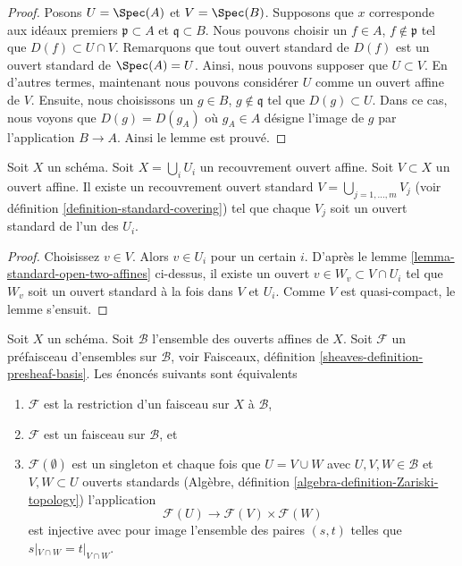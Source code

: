 \begin{proof}
Posons $U = \Spec(A)$ et $V = \Spec(B)$. Supposons
que $x$ corresponde aux idéaux premiers $\mathfrak p \subset
A$ et $\mathfrak q \subset B$. Nous pouvons
choisir un $f \in A$, $f \not \in \mathfrak p$ tel que $D(f) \subset
U \cap V$. Remarquons que tout ouvert standard de $D(f)$ est un ouvert
standard de $\Spec(A) = U$. Ainsi, nous pouvons supposer que $U
\subset V$. En d'autres termes, maintenant nous pouvons considérer
$U$ comme un ouvert affine de $V$. Ensuite, nous
choisissons un $g \in B$, $g \not \in \mathfrak
q$ tel que $D(g) \subset U$. Dans ce cas, nous voyons que $D(g) =
D(g_A)$ où $g_A \in A$ désigne l'image de $g$ par l'application $B \to A$.
Ainsi le lemme est prouvé.
\end{proof}

\begin{lemma}
\label{lemma-good-subcover}
Soit $X$ un schéma.
Soit $X = \bigcup_i U_i$ un recouvrement ouvert affine.
Soit $V \subset X$ un ouvert affine.
Il existe un recouvrement ouvert standard
$V = \bigcup_{j = 1, \ldots, m} V_j$ (voir
définition \ref{definition-standard-covering})
tel que chaque $V_j$ soit un ouvert standard de l'un des $U_i$.
\end{lemma}

\begin{proof}
Choisissez $v \in V$. Alors $v \in U_i$ pour un certain
$i$. D'après le lemme \ref{lemma-standard-open-two-affines} ci-dessus, il existe un
ouvert $v \in W_v \subset V \cap U_i$ tel que
$W_v$ soit un ouvert standard à la fois dans $V$ et
$U_i$. Comme $V$ est quasi-compact, le lemme s'ensuit.
\end{proof}

\begin{lemma}
\label{lemma-sheaf-on-affines}
Soit $X$ un schéma. Soit $\mathcal{B}$ l'ensemble des ouverts affines de $X$. Soit
$\mathcal{F}$ un préfaisceau d'ensembles sur $\mathcal{B}$, voir
Faisceaux, définition \ref{sheaves-definition-presheaf-basis}. Les énoncés suivants
sont équivalents
\begin{enumerate}
\item $\mathcal{F}$ est la restriction d'un faisceau sur $X$ à $\mathcal{B}$, \item
$\mathcal{F}$ est un faisceau sur $\mathcal{B}$, et
\item $\mathcal{F}(\emptyset)$ est un singleton et chaque
fois que $U = V \cup W$ avec $U, V, W \in \mathcal{B}$ et $V,
W \subset U$ ouverts standards
(Algèbre, définition \ref{algebra-definition-Zariski-topology})
l'application
$$
\mathcal{F}(U) \longrightarrow \mathcal{F}(V) \times \mathcal{F}(W)
$$
est injective avec pour image l'ensemble des paires $(s,
t)$ telles que $s|_{V \cap W} = t|_{V \cap W}$.
\end{enumerate}
\end{lemma}

